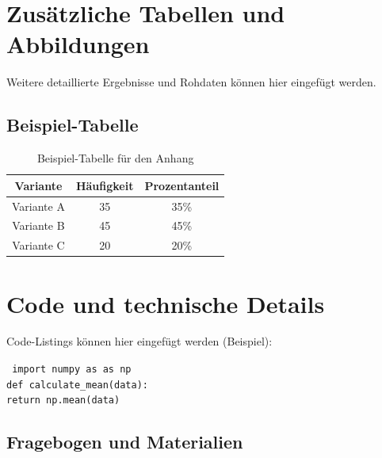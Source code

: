 
\chapter{Zusätzliche Tabellen und Abbildungen}
\label{app:tables}

Weitere detaillierte Ergebnisse und Rohdaten können hier eingefügt werden.

\section{Beispiel-Tabelle}

\begin{table}[h]
    \centering
    \caption{Beispiel-Tabelle für den Anhang}
    \label{tab:appendix_example}
    \begin{tabular}{ccc}
        \toprule
        \textbf{Variante} & \textbf{Häufigkeit} & \textbf{Prozentanteil} \\
        \midrule
        Variante A        & 35                  & 35\%                   \\
        Variante B        & 45                  & 45\%                   \\
        Variante C        & 20                  & 20\%                   \\
        \bottomrule
    \end{tabular}
\end{table}

\chapter{Code und technische Details}
\label{app:code}

Code-Listings können hier eingefügt werden (Beispiel):

\medskip
\noindent
\texttt{%
    import numpy as as np \\
    def calculate\_mean(data): \\
    \quad return np.mean(data) \\
}
\medskip

\section{Fragebogen und Materialien}
\label{app:materials}

